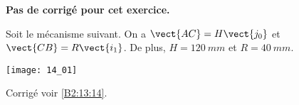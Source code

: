 \normalfalse \difficiletrue \tdifficilefalse
\correctionfalse


\setcounter{numques}{0}
\ifcorrection
\else
\textbf{Pas de corrigé pour cet exercice.}
\fi

\ifprof
\else
Soit le mécanisme suivant. On a $\vect{AC}=H\vect{j_0}$ et $\vect{CB}=R\vect{i_1}$. De plus, 
$H=\SI{120}{mm}$ et $R=\SI{40}{mm}$. 

\begin{center}
\texttt{[image: 14\_01]}
\end{center}
\fi


\ifprof
\else
\fi

\ifprof
\else
\fi

\ifprof
\else
\fi

\ifprof
\else
\fi





\ifprof
\else
\begin{flushright}
\footnotesize{Corrigé  voir \ref{B2:13:14}.}
\end{flushright}%
\fi